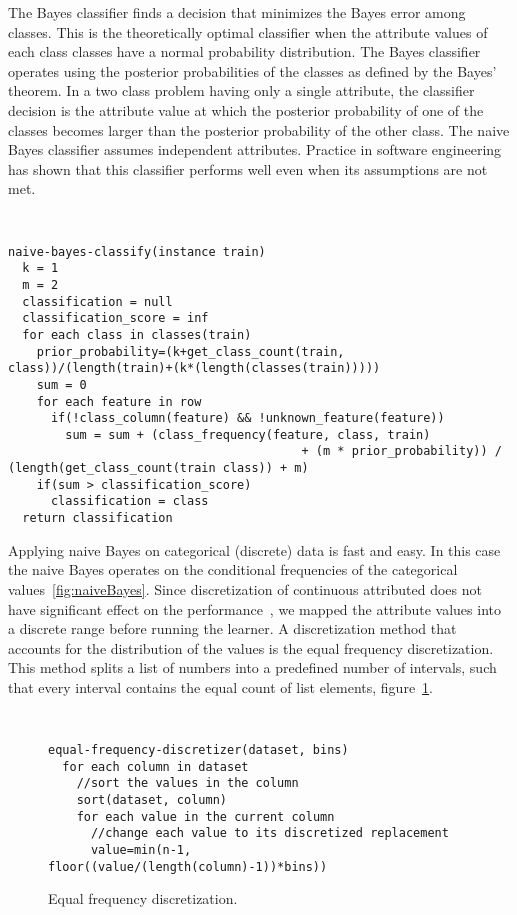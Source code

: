 \documentclass{sig-alternate}
\begin{document}
The Bayes classifier finds a decision that minimizes the Bayes error among classes. This is the theoretically
optimal classifier when the attribute values of each class classes have a normal probability distribution. The
Bayes classifier operates using the posterior probabilities of the classes as defined by the Bayes' theorem. In a
two class problem having only a single attribute, the classifier decision is the attribute value at which the
posterior probability of one of the classes becomes larger than the posterior probability of the other class. The
naive Bayes classifier assumes independent attributes. Practice in software engineering has shown that this
classifier performs well even when its assumptions are not met.
\begin{figure*}[tbp]
\makebox[\linewidth]{\hrulefill}
{\tt\small
\begin{verbatim}
naive-bayes-classify(instance train)
  k = 1
  m = 2
  classification = null
  classification_score = inf
  for each class in classes(train)
    prior_probability=(k+get_class_count(train, class))/(length(train)+(k*(length(classes(train)))))
    sum = 0
    for each feature in row
      if(!class_column(feature) && !unknown_feature(feature))
        sum = sum + (class_frequency(feature, class, train)
        						         + (m * prior_probability)) / (length(get_class_count(train class)) + m)
    if(sum > classification_score)
      classification = class
  return classification
\end{verbatim}}
\makebox[\linewidth]{\hrulefill}
\caption{Naive Bayes classifier on categorical data.}
\label{fig:naiveBayes}
\end{figure*}

Applying naive Bayes on categorical (discrete) data is fast and easy. In this case the naive Bayes operates on the
conditional frequencies of the categorical values~\ref{fig:naiveBayes}. Since discretization of continuous
attributed does not have significant effect on the performance~\cite{Dougherty95}, we mapped the attribute
values into a discrete range before running the learner. A discretization method that accounts for the distribution
of the values is the equal frequency discretization.  This method splits a list of numbers into a predefined
number of intervals, such that every interval contains the equal count of list elements,
figure~\ref{fig:discretization}.
\begin{figure}[tbp]
\makebox[\linewidth]{\hrulefill}
{\tt\small
\begin{verbatim}
equal-frequency-discretizer(dataset, bins)
  for each column in dataset
    //sort the values in the column
    sort(dataset, column)
    for each value in the current column
      //change each value to its discretized replacement
      value=min(n-1, floor((value/(length(column)-1))*bins))
\end{verbatim}}
\makebox[\linewidth]{\hrulefill}
\caption{Equal frequency discretization.}
\label{fig:discretization}
\end{figure}
\end{document}
